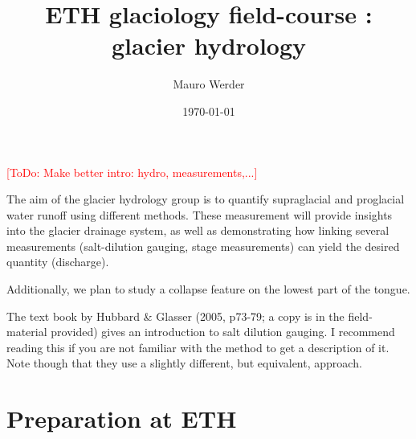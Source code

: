 \documentclass[DIV=15,halfparskip,11pt,headinclude]{scrartcl}
\author{Mauro Werder}
\date{\today}
\title{ETH glaciology field-course \the\year{}:\\ glacier hydrology}
\newcommand{\todo}[1]{\textcolor{red}{[ToDo: #1]}}
\newcommand{\todo}[1]{}
\begin{document}
  \maketitle
  \todo{Make better intro: hydro, measurements,...}

The aim of the glacier hydrology group is to quantify supraglacial and
proglacial water runoff using different methods.  %
These measurement
will provide insights into the glacier drainage system, as well as
demonstrating how linking several measurements (salt-dilution gauging,
stage measurements) can yield the desired quantity (discharge).

Additionally, we plan to study a collapse feature on the lowest part
of the tongue.

The text book by Hubbard \& Glasser (2005, p73-79; a copy is in the
field-material provided) gives an introduction to salt dilution
gauging.  I recommend reading this if you are not familiar with the
method to get a description of it.  Note though that they use a
slightly different, but equivalent, approach.

\section{Preparation at ETH}

%
\end{document}
